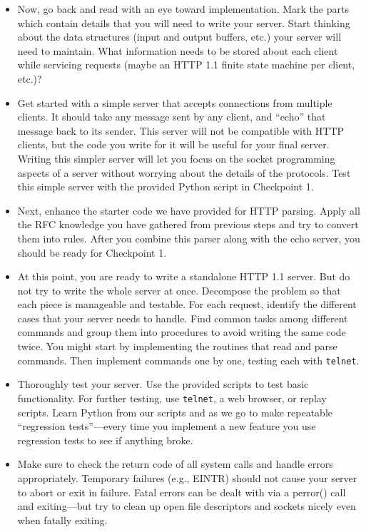 \begin{itemize}
	\item Now, go back and read with an eye toward implementation. Mark the
      parts which contain details that you will need to write your server.
      Start thinking about the data structures (input and output buffers, etc.)
      your server will need to maintain. What information needs to be stored
      about each client while servicing requests (maybe an HTTP 1.1 finite state
      machine per client, etc.)?

	\item Get started with a simple server that accepts connections from
	  multiple clients. It should take any message sent by any client, and
	  ``echo'' that message back to its sender.  This server will not be
	  compatible with HTTP clients, but the code you write for it will be
	  useful for your final server. Writing this simpler server will let you
	  focus on the socket programming aspects of a server without worrying
	  about the details of the protocols. Test this simple server with the provided Python script in Checkpoint 1.

    \item Next, enhance the starter code we have provided for HTTP parsing. Apply all the RFC knowledge you have gathered from previous steps and try to convert them into rules. After you combine this parser along with the echo server, you should be ready for Checkpoint 1. 
    
	\item At this point, you are ready to write a standalone HTTP 1.1
      server. But do not try to write the whole server at once. Decompose the
      problem so that each piece is manageable and testable.  For each request,
      identify the different cases that your server needs to handle. Find common
      tasks among different commands and group them into procedures to avoid
      writing the same code twice. You might start by implementing the routines
      that read and parse commands. Then implement commands one by one, testing
      each with \texttt{telnet}.

	\item Thoroughly test your server. Use the provided scripts to test basic
	  functionality. For further testing, use \texttt{telnet}, a web browser,
	  or replay scripts. Learn Python from our scripts and as we go to make
	  repeatable ``regression tests''---every time you implement a new feature
	  you use regression tests to see if anything broke.

	\item Make sure to check the return code of all system calls and handle
      errors appropriately. Temporary failures (e.g., EINTR) should not cause
      your server to abort or exit in failure.  Fatal errors can be dealt with
      via a perror() call and exiting---but try to clean up open file descriptors
      and sockets nicely even when fatally exiting.


\end{itemize}
